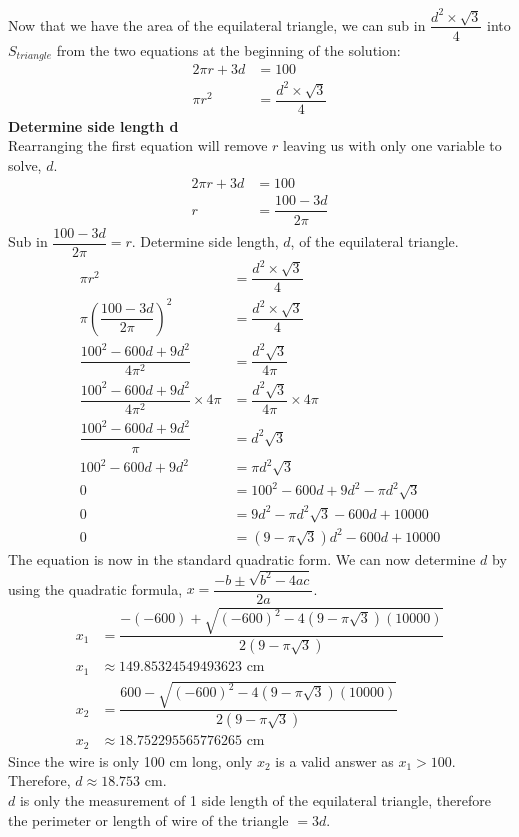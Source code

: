 \documentclass[12pt]{book}
\begin{document}
\begin{enumerate}
Now that we have the area of the equilateral triangle, we can sub in $\dfrac{d^2 \times \sqrt{3}}{4}$ into $S_{triangle}$ from the two equations at the beginning of the solution:
\begin{align*}
    2\pi r + 3d &=  100\\
    \pi r^2 &=  \dfrac{d^2 \times \sqrt{3}}{4}
\end{align*}
\textbf{Determine side length d}\\
Rearranging the first equation will remove $r$ leaving us with only one variable to solve, $d$.\\
\begin{align*}
    2\pi r + 3d &=  100\\
    r &= \dfrac{100 - 3d}{2\pi}
\end{align*}
Sub in $\dfrac{100 - 3d}{2\pi} = r$. Determine side length, $d$, of the equilateral triangle.
\begin{align*}
    \pi r^2 &=  \dfrac{d^2 \times \sqrt{3}}{4}\\
    \pi \left(\dfrac{100 - 3d}{2\pi} \right)^2 &= \dfrac{d^2 \times \sqrt{3}}{4}\\
    \dfrac{100^2 - 600d + 9d^2}{4\pi^2} &= \dfrac{d^2\sqrt{3}}{4\pi}\\
    \dfrac{100^2 - 600d + 9d^2}{4\pi^2} \times 4 \pi &= \dfrac{d^2\sqrt{3}}{4\pi} \times 4 \pi\\
    \dfrac{100^2 - 600d + 9d^2}{\pi} &= d^2\sqrt{3}\\
    100^2 - 600d + 9d^2 &= \pi d^2\sqrt{3}\\
    0 &=  100^2 - 600d + 9d^2 -  \pi d^2\sqrt{3}\\
    0 &=  9d^2 -  \pi d^2\sqrt{3} - 600d + 10000\\
    0 &=  (9 - \pi \sqrt{3})d^2 - 600d + 10000
\end{align*}
The equation is now in the standard quadratic form. We can now determine $d$ by using the quadratic formula, $x = \dfrac{-b  \pm \sqrt{b^2 - 4ac}}{2a}$.\\
\begin{align*}
    x_1 &= \dfrac{-(-600) + \sqrt{(-600)^2 - 4(9 - \pi \sqrt{3})(10000)}}{2(9 - \pi \sqrt{3})}\\
    x_1 &\approx 149.85324549493623 \text{ cm}\\
    x_2 &= \dfrac{600 - \sqrt{(-600)^2 - 4(9 - \pi \sqrt{3})(10000)}}{2(9 - \pi \sqrt{3})}\\
    x_2 &\approx 18.752295565776265 \text{ cm}
\end{align*}
Since the wire is only 100 cm long, only $x_2$ is a valid answer as $x_1 > 100$. Therefore, $d \approx 18.753$ cm.\\
$d$ is only the measurement of 1 side length of the equilateral triangle, therefore the perimeter or length of wire of the triangle $= 3d$.\\


\end{enumerate}
\end{document}
